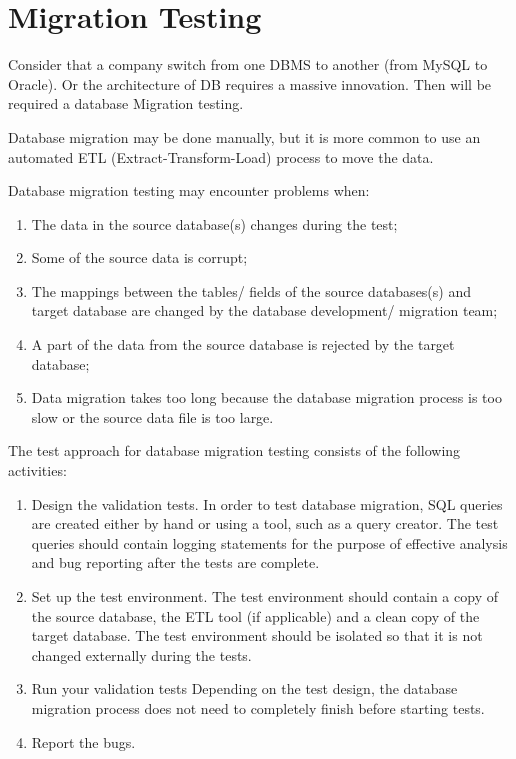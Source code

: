 \section{Migration Testing}
\label{sec:Migration Testing}

Consider that a company switch from one DBMS to another (from MySQL to Oracle). Or the architecture of DB requires a massive innovation. Then will be required a database Migration testing.

Database migration may be done manually, but it is more common to use an automated ETL (Extract-Transform-Load) process to move the data.

Database migration testing may encounter problems when:
\begin{enumerate}
 \item The data in the source database(s) changes during the test;
 \item Some of the source data is corrupt;
 \item The mappings between the tables/ fields of the source databases(s) and target database are changed by the database development/ migration team;
 \item A part of the data from the source database is rejected by the target database;
 \item Data migration takes too long because the database migration process is too slow or the source data file is too large.
 \end{enumerate}
 
 The test approach for database migration testing consists of the following activities:
 
\begin{enumerate}
 \item  
 Design the validation tests. In order to test database migration, SQL queries are created either by hand or using a tool, such as a query creator. The test queries should contain logging statements for the purpose of effective analysis and bug reporting after the tests are complete.
 \item Set up the test environment. The test environment should contain a copy of the source database, the ETL tool (if applicable) and a clean copy of the target database. The test environment should be isolated so that it is not changed externally during the tests.
 \item Run your validation tests Depending on the test design, the database migration process does not need to completely finish before starting tests.
 \item Report the bugs.
 \end{enumerate}